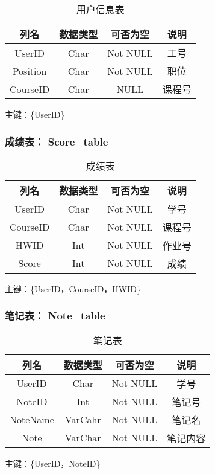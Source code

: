 \begin{table}[htbp]
\centering
\caption{用户信息表} \label{tab:classification}
\begin{tabular}{|c|c|c|c|}
    \hline
    列名 & 数据类型 & 可否为空 & 说明 \\
	\hline
    UserID & Char & Not NULL & 工号 \\
    \hline
    Position & Char & Not NULL & 职位 \\
    \hline
    CourseID & Char & NULL & 课程号 \\
    \hline
\end{tabular}
\end{table}
主键：\{UserID\}


\subsubsection{成绩表： Score\_table}

\begin{table}[htbp]
\centering
\caption{成绩表} \label{tab:classification}
\begin{tabular}{|c|c|c|c|}
    \hline
    列名 & 数据类型 & 可否为空 & 说明 \\
	\hline
    UserID & Char & Not NULL & 学号 \\
    \hline
    CourseID & Char & Not NULL & 课程号 \\
    \hline
    HWID & Int & Not NULL & 作业号 \\
    \hline
    Score & Int & Not NULL & 成绩 \\
    \hline
\end{tabular}
\end{table}
主键：\{UserID，CourseID，HWID\}


\subsubsection{笔记表： Note\_table}

\begin{table}[htbp]
\centering
\caption{笔记表} \label{tab:classification}
\begin{tabular}{|c|c|c|c|}
    \hline
    列名 & 数据类型 & 可否为空 & 说明 \\
	\hline
    UserID & Char & Not NULL & 学号 \\
    \hline
    NoteID & Int & Not NULL & 笔记号 \\
    \hline
    NoteName & VarCahr & Not NULL & 笔记名 \\
    \hline
    Note & VarChar & Not NULL & 笔记内容 \\
    \hline
\end{tabular}
\end{table}
主键：\{UserID，NoteID\}


